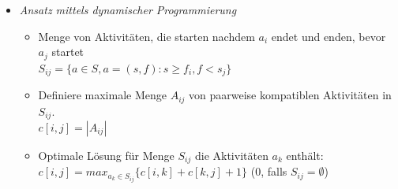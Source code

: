\documentclass[
    12pt,
    a4paper,
    ngerman,
    color=3b,%
    marginpar=false,
    colorback=false,
    leqno,
]{tudaexercise}
\begin{document}
\begin{itemize}
\begin{itemize}
\begin{itemize}
\begin{minipage}{0.3\textwidth}
                            \end{minipage}
                    \end{itemize}
                \item \textit{Ansatz mittels dynamischer Programmierung}
                    \begin{itemize}
                        \item Menge von Aktivitäten, die starten nachdem $a_i$ endet und enden, bevor $a_j$ startet \\
                                $S_{ij} = \{a \in S,a = (s,f): s \geq f_i, f < s_j\}$
                        \item Definiere maximale Menge $A_{ij}$ von paarweise kompatiblen Aktivitäten in $S_{ij}$. \\
                                $c[i,j] = |A_{ij}|$
                        \item Optimale Lösung für Menge $S_{ij}$ die Aktivitäten $a_k$ enthält: \\
                                $c[i,j] = max_{a_k\in S_{ij}}\{c[i,k] + c[k,j] + 1\}$ ($0$, falls $S_{ij} = \emptyset$)
                    \end{itemize}


\end{itemize}
\end{itemize}
\end{document}
